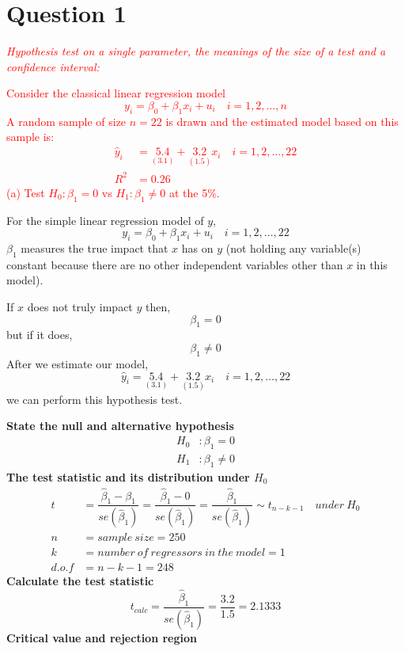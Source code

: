 \documentclass[12pt]{report}
\begin{document}
\newpage
\section*{Question 1}
\noindent \textcolor{red}{\textit{Hypothesis test on a single parameter, the meanings of the size of a test and a confidence interval:}}

\noindent \textcolor{red}{Consider the classical linear regression model $$y_i = \beta_0 + \beta_1 x_i + u_i \quad i=1,2,\dots,n$$ A random sample of size $n=22$ is drawn and the estimated model based on this sample is:
\begin{align*}
	\hat{y}_i &= \underset{(3.1)}{5.4} + \underset{(1.5)}{3.2}x_i \quad i=1,2,\dots,22 \\
	R^2 &= 0.26 
\end{align*} (a) Test $H_0: \beta_1 = 0$ vs $H_1: \beta_1 \neq 0$ at the 5\%.}

\noindent For the simple linear regression model of $y$, $$y_i = \beta_0 + \beta_1 x_i + u_i \quad i=1,2,\dots,22$$ $\beta_1$ measures the true impact that $x$ has on $y$ (not holding any variable(s) constant because there are no other independent variables other than $x$ in this model). 

\noindent If $x$ does not truly impact $y$ then, $$\beta_1 = 0$$ but if it does,  $$\beta_1 \neq 0$$ After we estimate our model, $$\hat{y}_i = \underset{(3.1)}{5.4} + \underset{(1.5)}{3.2}x_i \quad i=1,2,\dots,22$$ we can perform this hypothesis test.

\noindent \textbf{State the null and alternative hypothesis}
\begin{align*}
H_0&: \beta_1 = 0 \\
H_1&: \beta_1 \neq 0
\end{align*}
\noindent \textbf{The test statistic and its distribution under $H_0$}
\begin{align*}
t &= \dfrac{\hat{\beta}_1 - \beta_1}{se(\hat{\beta}_1)} = \dfrac{\hat{\beta}_1 - 0}{se(\hat{\beta}_1)} = \dfrac{\hat{\beta}_1}{se(\hat{\beta}_1)} \sim t_{n-k-1} \quad under\ H_0 \\
n &= sample\ size = 250 \\
k &= number\ of\ regressors\ in\ the\ model = 1 \\
d.o.f &= n-k-1=248
\end{align*}
\noindent \textbf{Calculate the test statistic}
$$t_{calc} = \dfrac{\hat{\beta}_1}{se(\hat{\beta}_1)} = \dfrac{3.2}{1.5} = 2.1333$$
\noindent \textbf{Critical value and rejection region}
\end{document}

